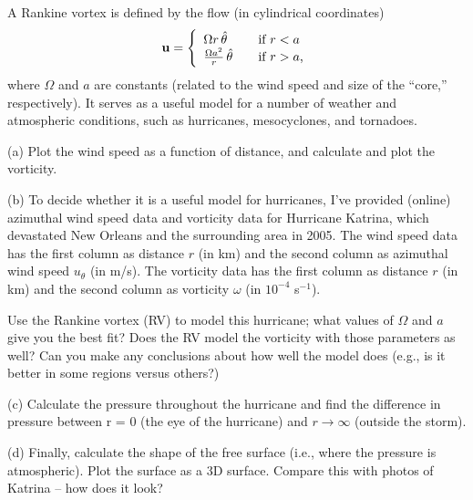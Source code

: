 \begin{problem}
A Rankine vortex is defined by the flow (in cylindrical coordinates)
\[
\mathbf{u}  = \left\{
 \begin{array}{l l}
    \Omega r \, \hat{\theta} & \quad \text{if $r < a$}\\
   \frac{\Omega a^2}{r} \, \hat{\theta} & \quad \text{if $r>a$,}
  \end{array} \right.
\]
where $\Omega$ and $a$ are constants (related to the wind speed and size of the ``core,'' respectively).  It serves as a useful model for a number of weather and atmospheric conditions, such as hurricanes, mesocyclones, and tornadoes.  

(a) Plot the wind speed as a function of distance, and calculate and plot the vorticity.

(b) To decide whether it is a useful model for hurricanes, I've provided (online) azimuthal wind speed data and vorticity data for Hurricane Katrina, which devastated New Orleans and the surrounding area in 2005.  The wind speed data has the first column as distance $r$ (in km) and the second column as azimuthal wind speed $u_\theta$ (in m/s).  The vorticity data has the first column as distance $r$ (in km) and the second column as vorticity $\omega$ (in $10^{-4}$ s$^{-1}$).

Use the Rankine vortex (RV) to model this hurricane; what values of $\Omega$ and $a$ give you the best fit?  Does the RV model the vorticity with those parameters as well?  Can you make any conclusions about how well the model does (e.g., is it better in some regions versus others?)

(c) Calculate the pressure throughout the hurricane and find the difference in pressure between r = 0 (the eye of the hurricane) and $r \to \infty$ (outside the storm).

(d) Finally, calculate the shape of the free surface (i.e., where the pressure is atmospheric). Plot the surface as a 3D surface. Compare this with photos of Katrina -- how does it look?
\end{problem}



